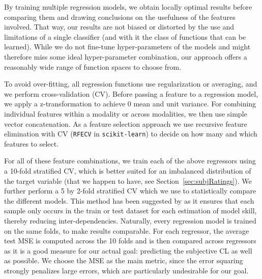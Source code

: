 \documentclass[output=paper]{langsci/langscibook}
\begin{document}
By training multiple regression models, we obtain locally optimal results before comparing them and drawing conclusions on the usefulness of the features involved. That way, our results are not biased or distorted by the use and limitations of a single classifier (and with it the class of functions that can be learned). While we do not fine-tune hyper-parameters of the models and might therefore miss some ideal hyper-parameter combination, our approach offers a reasonably wide range of function spaces to choose from.

To avoid over-fitting, all regression functions use regularization or averaging, and we perform cross-validation (CV).
Before passing a feature to a regression model, we apply a z-transformation to achieve 0 mean and unit variance.
For combining individual features within a modality or across modalities, we then use simple vector concatenation.
As a feature selection approach we use recursive feature elimination with CV (\texttt{RFECV} in \texttt{scikit-learn}) to decide on how many and which features to select.

For all of these feature combinations, we train each of the above regressors using a 10-fold stratified CV, which is better suited for an imbalanced distribution of the target variable (that we happen to have, see Section~\ref{sec:subjRatings}).
We further perform a 5 by 2-fold stratified CV which we use to statistically compare the different models. This method has been suggested by \citet{dietterich1998approximate} as it ensures that each sample only occurs in the train or test dataset for each estimation of model skill, thereby reducing inter-dependencies. Naturally, every regression model is trained on the same folds, to make results comparable.
For each regressor, the average test MSE is computed across the 10 folds and is then compared across regressors as it is a good measure for our actual goal: predicting the subjective CL as well as possible. We choose the MSE as the main metric, since the error squaring strongly penalizes large errors, which are particularly undesirable for our goal.

\end{document}
